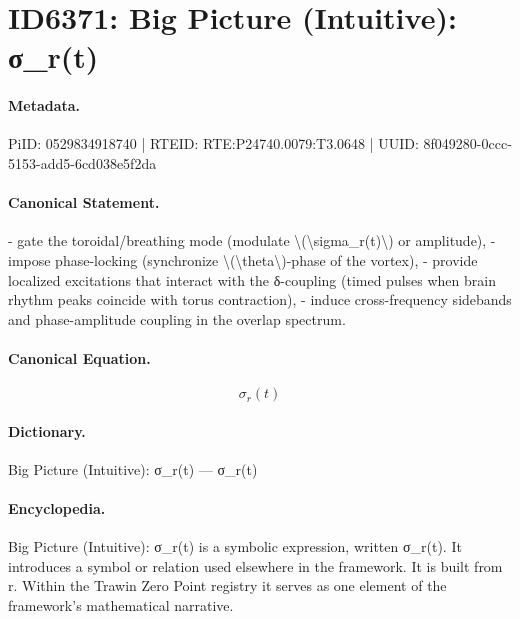 \section*{ID6371: Big Picture (Intuitive): σ\_r(t)}
\paragraph{Metadata.}
PiID: 0529834918740 | RTEID: RTE:P24740.0079:T3.0648 | UUID: 8f049280-0ccc-5153-add5-6cd038e5f2da

\paragraph{Canonical Statement.}
- gate the toroidal/breathing mode (modulate \textbackslash{}(\textbackslash{}sigma\_r(t)\textbackslash{}) or amplitude), - impose phase-locking (synchronize \textbackslash{}(\textbackslash{}theta\textbackslash{})-phase of the vortex), - provide localized excitations that interact with the δ-coupling (timed pulses when brain rhythm peaks coincide with torus contraction), - induce cross-frequency sidebands and phase-amplitude coupling in the overlap spectrum.

\paragraph{Canonical Equation.}
\[
\sigma_r(t)
\]

\paragraph{Dictionary.}
Big Picture (Intuitive): σ\_r(t) — σ\_r(t)

\paragraph{Encyclopedia.}
Big Picture (Intuitive): σ\_r(t) is a symbolic expression, written σ\_r(t). It introduces a symbol or relation used elsewhere in the framework. It is built from r. Within the Trawin Zero Point registry it serves as one element of the framework's mathematical narrative.
